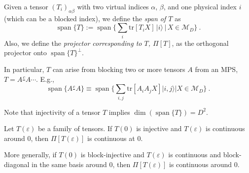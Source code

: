 \documentclass[cmp]{svjour}
\newcommand{\mc}[1]{\mathcal{#1}}
\newcommand{\veps}{\varepsilon}
\newcommand{\tr}{\mathrm{tr}}
\DeclareMathOperator{\spann}{span}
\newcommand{\ket}[1]{|#1\rangle}
\def\cont{\tfrac{c}{\ \ }}
\DeclareMathOperator{\spanned}{span}
\begin{document}
\begin{definition}
    Given a tensor $(T_i)_{\alpha\beta}$ with two virtual indices $\alpha$,
    $\beta$, and one physical index $i$ (which can be a blocked index), we
    define the \emph{span of $T$} as
    \[
        \spann\{T\}:=\spann\big\{\sum_i\tr[T_iX]\,\ket{i}\,
        \big\vert\, X \in \mc M_D\big\}\ .
    \]
    Also, we define the \emph{projector corresponding to $T$, $\Pi[T]$}, as the orthogonal projector onto $\spann\{T\}^\perp$.
\end{definition}
In particular, $T$ can arise from blocking two or more tensors $A$ from an
MPS, $T=A\cont A\cdots$. E.g.,
\begin{equation}
    \label{eq:span-2}
    \spann\{A\cont A\}
    \equiv \spann\big\{\sum_{i,j}
    \tr[A_{i}A_{j}X]\ket{i,j}\big\vert X\in \mc M_D\big\}\ .
\end{equation}


Note that injectivity of a tensor $T$ implies $\dim (\spanned\{T\})=D^2$.


\begin{lemma}
    \label{lemma:span-continuity}
    Let $T(\veps)$ be a family of tensors.  If $T(0)$ is injective and
    $T(\veps)$ is continuous around $0$, then $\Pi[T(\veps)]$ is continuous at
    $0$.

    More generally, if $T(0)$ is block-injective and $T(\veps)$ is continuous
    and block-diagonal in the same basis around $0$, then $\Pi[T(\veps)]$
    is continuous around $0$.
\end{lemma}
\end{document}
